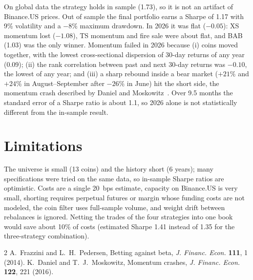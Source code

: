 \documentclass[aps,prl,onecolumn,superscriptaddress,nofootinbib]{revtex4-2}
\begin{document}
	On global data the strategy holds in sample (1.73), so it is not an artifact of Binance.US prices. Out of sample the final portfolio earns a Sharpe of 1.17 with 9\% volatility and a $-8\%$ maximum drawdown. In 2026 it was flat ($-0.05$): XS momentum lost ($-1.08$), TS momentum and fire sale were about flat, and BAB (1.03) was the only winner. Momentum failed in 2026 because (i) coins moved together, with the lowest cross-sectional dispersion of 30-day returns of any year (0.09); (ii) the rank correlation between past and next 30-day returns was $-0.10$, the lowest of any year; and (iii) a sharp rebound inside a bear market ($+21\%$ and $+24\%$ in August--September after $-26\%$ in June) hit the short side, the momentum crash described by Daniel and Moskowitz~\cite{daniel2016}. Over 9.5 months the standard error of a Sharpe ratio is about 1.1, so 2026 alone is not statistically different from the in-sample result.
	
	\section{Limitations}
	\label{app:limits}
	
	The universe is small (13 coins) and the history short (6 years); many specifications were tried on the same data, so in-sample Sharpe ratios are optimistic. Costs are a single 20~bps estimate, capacity on Binance.US is very small, shorting requires perpetual futures or margin whose funding costs are not modeled, the coin filter uses full-sample volume, and weight drift between rebalances is ignored. Netting the trades of the four strategies into one book would save about 10\% of costs (estimated Sharpe 1.41 instead of 1.35 for the three-strategy combination).
	
	\begin{thebibliography}{2}
		 A.~Frazzini and L.~H.~Pedersen, Betting against beta, \textit{J. Financ. Econ.} \textbf{111}, 1 (2014).
		 K.~Daniel and T.~J.~Moskowitz, Momentum crashes, \textit{J. Financ. Econ.} \textbf{122}, 221 (2016).
	\end{thebibliography}
	
\end{document}
